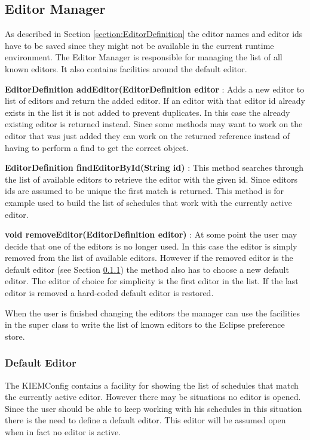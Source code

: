 \subsection{Editor Manager}
\label{section:EditorManager}
As described in Section \ref{section:EditorDefinition} the editor names and editor ids have to be saved
since they might not be available in the current runtime environment. The Editor Manager is responsible
for managing the list of all known editors. It also contains facilities around the default editor.

\begin{description}
 \item \textbf{EditorDefinition addEditor(EditorDefinition editor} : Adds a new editor to list of 
editors and return the added editor. If an editor with that editor id already exists in the list it is
not added to prevent duplicates. In this case the already existing editor is returned instead. Since
some methods may want to work on the editor that was just added they can work on the returned reference
instead of having to perform a find to get the correct object.
 \item \textbf{EditorDefinition findEditorById(String id)} : This method searches through the list
of available editors to retrieve the editor with the given id. Since editors ids are assumed to be
unique the first match is returned. This method is for example used to build the list of schedules that
work with the currently active editor.
 \item \textbf{void removeEditor(EditorDefinition editor)} : At some point the user may decide that
one of the editors is no longer used. In this case the editor is simply removed from the list of
available editors. However if the removed editor is the default editor (see Section \ref{section:DefaultEditor})
the method also has to choose a new default editor. The editor of choice for simplicity is the first
editor in the list. If the last editor is removed a hard-coded default editor is restored.
\end{description}

When the user is finished changing the editors the manager can use the facilities in the super class to
write the list of known editors to the Eclipse preference store.


\subsubsection{Default Editor}
\label{section:DefaultEditor}
The \ac{KIEMConfig} contains a facility for showing the list of schedules that match the currently active
editor. However there may be situations no editor is opened. Since the user should be able to keep working
with his schedules in this situation there is the need to define a default editor. This editor will be assumed open 
when in fact no editor is active.

